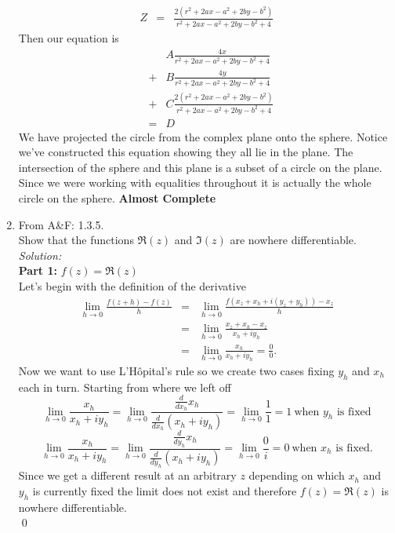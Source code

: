 \documentclass[10pt]{amsart}
\theoremstyle{nonumberplain}
\begin{document}
\begin{enumerate}[label={\bf {\arabic*}:}]
\begin{eqnarray*}
Z &=& \frac{2\left(r^2 +2ax - a^2 +2by - b^2\right)}{r^2 +2ax - a^2 +2by - b^2 + 4}
\end{eqnarray*}
Then our equation is
\begin{eqnarray*}
&& A\frac{4x}{r^2 +2ax - a^2 +2by - b^2 + 4}  \\
&+& B\frac{4y}{r^2 +2ax - a^2 +2by - b^2 + 4} \\
&+& C\frac{2\left(r^2 +2ax - a^2 +2by - b^2\right)}{r^2 +2ax - a^2 +2by - b^2 + 4} \\
&=& D
\end{eqnarray*}
We have projected the circle from the complex plane onto the sphere. Notice we've constructed this equation showing they all lie in the plane. The intersection of the sphere and this plane is a subset of a circle on the plane. Since we were working with equalities throughout it is actually the whole circle on the sphere.
\textbf{Almost Complete} \\

\item From A\&F: 1.3.5.\\
Show that the functions $\Re(z)$ and $\Im(z)$ are nowhere differentiable. \\
\textit{Solution:} \\
\textbf{Part 1:} $f(z) = \Re(z)$ \\
Let's begin with the definition of the derivative
\begin{eqnarray*}
\lim_{h \rightarrow 0} \frac{f(z + h) - f(z)}{h} &=& \lim_{h \rightarrow 0} \frac{f(x_z + x_h + i (y_z + y_h) ) - x_z}{h} \\
								 &=& \lim_{h \rightarrow 0} \frac{x_z + x_h - x_z}{x_h + iy_h} \\
								 &=& \lim_{h \rightarrow 0} \frac{x_h}{x_h + iy_h} = \frac{0}{0}.						
\end{eqnarray*}
Now we want to use L'Hôpital's rule so we create two cases fixing $y_h$ and $x_h$ each in turn.
Starting from where we left off
$$ \lim_{h \rightarrow 0} \frac{x_h}{x_h + iy_h} = \lim_{h \rightarrow 0} \frac{ \frac{d}{dx_h}x_h}{\frac{d}{dx_h}(x_h + iy_h)} = \lim_{h \rightarrow 0} \frac{1}{1} = 1 \: \text{when $y_h$ is fixed} $$
$$ \lim_{h \rightarrow 0} \frac{x_h}{x_h + iy_h} = \lim_{h \rightarrow 0} \frac{ \frac{d}{dy_h}x_h}{\frac{d}{dy_h}(x_h + iy_h)} = \lim_{h \rightarrow 0} \frac{0}{i} = 0 \: \text{when $x_h$ is fixed}. $$
Since we get a different result at an arbitrary $z$ depending on which $x_h$ and $y_h$ is currently fixed the limit does not exist and therefore $f(z) = \Re(z)$ is nowhere differentiable. \\
\qed


\end{enumerate}
\end{document}
